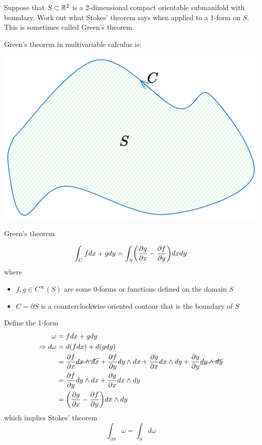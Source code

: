 \documentclass[10pt]{article}
\begin{document}
\begin{example}
	Suppose that $S \subset \mathbb{R}^2$ is a 2-dimensional compact orientable submanifold with boundary. Work out what Stokes' theorem says when applied to a 1-form on $S$. This is sometimes called Green's theorem.
\end{example}
\sol Green's theorem in multivariable calculus is:
\begin{marginfigure}
	\begin{center}
		\includegraphics[width=1.2\textwidth]{figs/green.png}
	\end{center}
	\caption{Green's theorem}
\end{marginfigure}
$$
\int_C fdx+gdy = \int_S\p*{\pd{g}{x}-\pd{f}{y}}dxdy
$$
where 
\begin{itemize}
	\item $f,g \in C^\infty(S)$ are some 0-forms or functions defined on the domain $S$
	\item $C = \partial S$ is a counterclockwise oriented contour that is the boundary of $S$
\end{itemize}
Define the 1-form 
$$
\begin{aligned}
	\omega &= fdx+gdy\\
	\Rightarrow d\omega &= d(fdx)+d(gdy)\\
	&= \pd{f}{x}\cancel{dx\wedge dx} + \pd{f}{y}dy\wedge dx + \pd{g}{x}dx\wedge dy + \pd{g}{y}\cancel{dy\wedge dy}\\
	&= \pd{f}{y}dy\wedge dx + \pd{g}{x}dx\wedge dy\\
	&= \p*{\pd{g}{x}-\pd{f}{y}}dx \wedge dy
\end{aligned}
$$ 
which implies Stokes' theorem
$$
	\int_{\partial S} \omega = \int_{S} d\omega
$$
\end{document}
